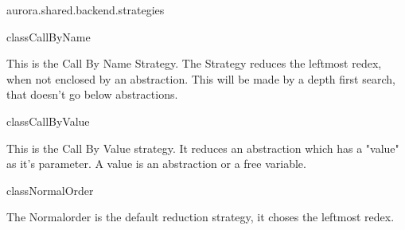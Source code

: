 \begin{texdocpackage}{aurora.shared.backend.strategies}
\label{texdoclet:aurora.shared.backend.strategies}

\begin{texdocclass}{class}{CallByName}
\label{texdoclet:aurora.shared.backend.strategies.CallByName}
\begin{texdocclassintro}
This is the Call By Name Strategy. The Strategy reduces the leftmost redex, when not enclosed by an abstraction.
 This will be made by a depth first search, that doesn't go below abstractions.\end{texdocclassintro}
\begin{texdocclassconstructors}
\end{texdocclassconstructors}
\begin{texdocclassmethods}
\end{texdocclassmethods}
\end{texdocclass}


\begin{texdocclass}{class}{CallByValue}
\label{texdoclet:aurora.shared.backend.strategies.CallByValue}
\begin{texdocclassintro}
This is the Call By Value strategy. It reduces an abstraction which has a "value" as it's parameter. A value is an abstraction or a free variable.\end{texdocclassintro}
\begin{texdocclassconstructors}
\end{texdocclassconstructors}
\begin{texdocclassmethods}
\end{texdocclassmethods}
\end{texdocclass}


\begin{texdocclass}{class}{NormalOrder}
\label{texdoclet:aurora.shared.backend.strategies.NormalOrder}
\begin{texdocclassintro}
The Normalorder is the default reduction strategy, it choses the leftmost redex.\end{texdocclassintro}
\begin{texdocclassconstructors}
\end{texdocclassconstructors}
\begin{texdocclassmethods}
\end{texdocclassmethods}
\end{texdocclass}



\end{texdocpackage}
